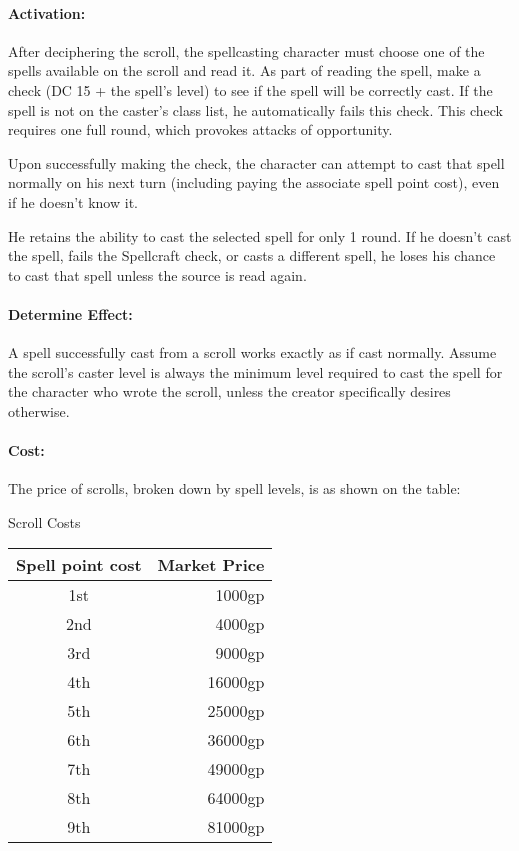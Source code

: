 \paragraph{Activation:} 
After deciphering the scroll, the spellcasting character must choose one of the spells available on the scroll and read it.
As part of reading the spell, make a  check  (DC 15 + the spell's level) to see if the spell will be correctly cast. 
If the spell is not on the caster's class list, he automatically fails this check.
This check requires one full round, which provokes attacks of opportunity.

Upon successfully making the check, the character can attempt to cast that spell normally on his next turn (including paying the associate spell point cost), even if he doesn't know it.
 
He retains the ability to cast the selected spell for only 1 round. 
If he doesn't cast the spell, fails the Spellcraft check, or casts a different spell, 
he loses his chance to cast that spell unless the source is read again.

\paragraph{Determine Effect:} 
A spell successfully cast from a scroll works exactly as if cast normally. 
Assume the scroll's caster level is always the minimum level required to cast the spell for the character who wrote the scroll, unless the creator specifically desires otherwise.

\paragraph{Cost:}
The price of scrolls, broken down by spell levels, is as shown on the  table:
\begin{tableonecolumn}
\caption{Scroll Costs}
\label{tab:ScrollCosts}
\begin{tabular}{|c|r|}
\hline
\textbf{Spell point cost}&\textbf{Market Price}\\
\hline
1st&	1000gp\\
2nd&	4000gp\\
3rd&	9000gp\\
4th&	16000gp\\
5th&	25000gp\\
6th&	36000gp\\
7th&	49000gp\\
8th&	64000gp\\
9th&	81000gp\\
\hline
\end{tabular}
\end{tableonecolumn}

